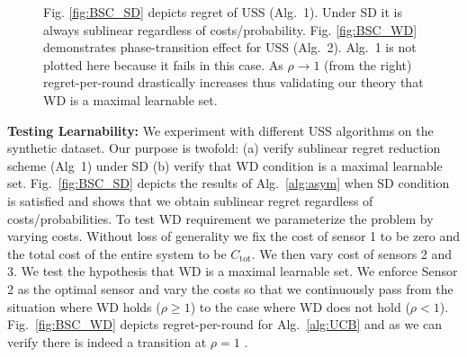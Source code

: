 \documentclass[11pt]{article} %
\begin{document}
\begin{center}
\begin{figure}[!bt]
\noindent
{\footnotesize Fig. \ref{fig:BSC_SD} depicts regret of USS (Alg.~1). Under SD it is always sublinear regardless of costs/probability. Fig. \ref{fig:BSC_WD} demonstrates phase-transition effect for USS (Alg.~2). Alg.~1 is not plotted here because it fails in this case. As $\rho \rightarrow 1$ (from the right) regret-per-round drastically increases thus validating our theory that WD is a maximal learnable set. 
}
\end{figure}
\end{center}

\noindent
{\bf Testing Learnability:}
We experiment with different USS algorithms on the synthetic dataset. Our purpose is twofold: (a) verify sublinear regret reduction scheme (Alg~1) under SD (b) verify that WD condition is a maximal learnable set. 
Fig.~\ref{fig:BSC_SD} depicts the results of Alg.~\ref{alg:asym} when SD condition is satisfied and shows that we obtain sublinear regret regardless of costs/probabilities. To test WD requirement we parameterize the problem by varying costs. Without loss of generality we fix the cost of sensor 1 to be zero and the total cost of the entire system to be $C_{\mbox{tot}}$. We then vary cost of sensors 2 and 3. %
We test the hypothesis that WD is a maximal learnable set. We enforce Sensor 2 as the optimal sensor and vary the costs so that we continuously pass from the situation where WD holds ($\rho \geq 1$) to the case where WD does not hold ($\rho < 1$). %
Fig.~\ref{fig:BSC_WD} depicts regret-per-round for Alg.~\ref{alg:UCB} and as we can verify there is indeed a transition at $\rho = 1$ . %
\end{document}
